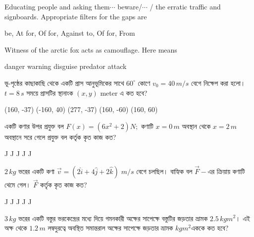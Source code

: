 \documentclass[addpoints]{exam}
\begin{document}
\begin{questions}
\question  Educating people and asking them$ \cdots $ beware/$ \cdots $ / the erratic traffic and signboards. Appropriate filters for the gaps are 

\begin{oneparchoices}
\choice be, At
\choice for, Of
\choice for, Against
\choice to, Of
\choice for, From
\end{oneparchoices}

\question Witness of the arctic fox acts as camouflage. Here  means   

\begin{oneparchoices}
\choice danger
\choice warning
\choice disguise
\choice predator
\choice attack
\end{oneparchoices}

\question  ভূ-পৃষ্ঠের কাছাকাছি থেকে একটি প্রাস আনুভূমিকের সাথে $ 60^{\circ} $ কোণে $ v_{0} =40\,m/s$ বেগে নিক্ষেপ করা হলো। $ t=8\,s $ সময়ে প্রাসটির স্থানাংক $ (x,y) $ meter এ কত হবে?

\begin{oneparchoices}
\choice (160, -37)
\choice (-160, 40)
\choice (277, -37)
\choice (160, -60)
\choice (160, 60)
\end{oneparchoices}

\question  একটি কণার উপর প্রযুক্ত বল $ F(x)= (6x^{2}+2)N; $ কণাটি $ x=0\,m $ অবস্থান থেকে $ x=2\,m $ অবস্থানে সরে গেলে প্রযুক্ত বল কর্তৃক কৃত কাজ কত?

\begin{oneparchoices}
 J
 J
 J
 J
 J
\end{oneparchoices}

\question $ 2\,kg $ ভরের একটি কণা $ \vec{v} = (2\hat{i}+4\hat{j}+2\hat{k}) \;m/s$ বেগে চলছিল। বাহ্যিক বল $ \vec{F} -$এর ক্রিয়ায় কণাটি থেমে গেল। $ \vec{F} $ কর্তৃক কৃত কাজ কত?

\begin{oneparchoices}
 J
 J
 J
 J
 J
\end{oneparchoices}

\question  $ 3\,kg $ ভরের একটি বস্তুর ভরকেন্দ্রের মধ্যে দিয়ে গমনকারী অক্ষের সাপেক্ষে  বস্তুটির জড়তার ভ্রামক $ 2.5\,kgm^{2} $। এই অক্ষ থেকে $ 1.2\,m $ লম্বদুরত্বে অবস্থিত সমান্তরাল অক্ষের সাপেক্ষে জড়তার ভ্রামক $ kgm^{2} $এককে কত হবে?

\begin{oneparchoices}
\end{oneparchoices}


\end{questions}
\end{document}
